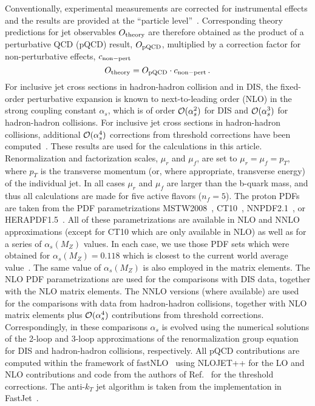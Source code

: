 \documentclass[11pt]{article}
\newcommand{\as}{\alpha_s}
\newcommand{\asmz}{\alpha_s(M_Z)}
\newcommand{\ord}{{\cal O}}
\begin{document}
Conventionally, experimental measurements are corrected 
for instrumental effects and the results are provided at the 
``particle level''~\cite{Buttar:2008jx}.
%
Corresponding theory predictions for jet observables
${O}_{\rm theory}$
are therefore obtained as the product of 
a perturbative QCD (pQCD) result, ${ O}_{\rm pQCD}$,
multiplied by a correction factor for non-perturbative effects,
$c_{\rm non-pert}$
%
\begin{equation}
 { O}_{\rm theory} =  
   { O}_{\rm pQCD}
    \cdot  c_{{\rm non-pert}}       \, .
\label{eq:allQCD}
\end{equation}
%
For inclusive jet cross sections in hadron-hadron collision and in DIS, 
the fixed-order perturbative expansion is known to next-to-leading order (NLO)
in the strong coupling constant $\as$, which is of order $\ord(\as^2)$ for DIS
and $\ord(\as^3)$ for hadron-hadron collisions.
For inclusive jet cross sections in hadron-hadron collisions, additional
$\ord(\as^4)$ corrections from threshold corrections have been 
computed~\cite{Kidonakis:2000gi}.
These results are used for the calculations in this article.
%
Renormalization and factorization scales, $\mu_r$ and $\mu_f$,
are set to $\mu_r = \mu_f = p_T$, where $p_T$ is the
transverse momentum (or, where appropriate, transverse energy)
of the individual jet.
%
In all cases $\mu_r$ and $\mu_f$ are larger than the b-quark mass, 
and thus all calculations are made for five active flavors ($n_f=5$). 
%
The proton PDFs are taken from the 
PDF parametrizations MSTW2008~\cite{Martin:2009iq},
CT10~\cite{Lai:2010vv}, 
NNPDF2.1~\cite{Ball:2011mu},
or HERAPDF1.5~\cite{herapdf15nlo, herapdf15nnlo}.
All of these parametrizations
are available in NLO and NNLO approximations 
(except for CT10 which are only available in NLO)
as well as for a series of $\asmz$ values.
In each case, we use those PDF sets which were obtained
for $\asmz = 0.118$ which is closest
to the current world average value~\cite{Bethke:2009jm}.
The same value of $\asmz$ is also employed in the matrix elements.
%
The NLO PDF parametrizations are used for
the comparisons with DIS data, together with the NLO matrix elements.
The NNLO versions (where available) are used for the comparisons with 
data from hadron-hadron collisions, together with NLO matrix elements
plus $\ord(\as^4)$ contributions from threshold corrections.
%
Correspondingly, in these comparisons $\as$ is evolved using 
the numerical solutions of
the 2-loop and 3-loop approximations of the renormalization group equation 
for DIS and hadron-hadron collisions, respectively.
%
All pQCD contributions are computed within the framework of
fastNLO~\cite{Kluge:2006xs}
using NLOJET++\cite{Nagy:2003tz,Nagy:2001fj} for the LO and NLO contributions
and code from the authors of Ref.~\cite{Kidonakis:2000gi}
for the threshold corrections.
The anti-$k_T$ jet algorithm is taken from the implementation in
{\sc FastJet}~\cite{Cacciari:2005hq}.
\end{document}
